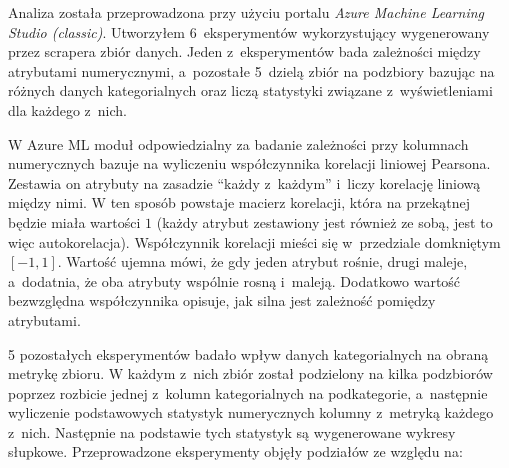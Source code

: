 Analiza została przeprowadzona przy użyciu portalu \emph{Azure Machine Learning Studio (classic)}.
Utworzyłem 6~eksperymentów wykorzystujący wygenerowany przez scrapera zbiór danych.
Jeden z~eksperymentów bada zależności między atrybutami numerycznymi, a~pozostałe 5~dzielą zbiór na podzbiory bazując na różnych danych kategorialnych oraz liczą statystyki związane z~wyświetleniami dla każdego z~nich.

W Azure ML moduł odpowiedzialny za badanie zależności przy kolumnach numerycznych bazuje na wyliczeniu współczynnika korelacji liniowej Pearsona.
Zestawia on atrybuty na zasadzie ``każdy z~każdym'' i~liczy korelację liniową między nimi.
W ten sposób powstaje macierz korelacji, która na przekątnej będzie miała wartości \(1\) (każdy atrybut zestawiony jest również ze sobą, jest to więc autokorelacja).
Współczynnik korelacji mieści się w~przedziale domkniętym \([-1, 1]\).
Wartość ujemna mówi, że gdy jeden atrybut rośnie, drugi maleje, a~dodatnia, że oba atrybuty wspólnie rosną i~maleją.
Dodatkowo wartość bezwzględna współczynnika opisuje, jak silna jest zależność pomiędzy atrybutami.

5 pozostałych eksperymentów badało wpływ danych kategorialnych na obraną metrykę zbioru.
W każdym z~nich zbiór został podzielony na kilka podzbiorów poprzez rozbicie jednej z~kolumn kategorialnych na podkategorie, a~następnie wyliczenie podstawowych statystyk numerycznych kolumny z~metryką każdego z~nich.
Następnie na podstawie tych statystyk są wygenerowane wykresy słupkowe.
Przeprowadzone eksperymenty objęły podziałów ze względu na:

